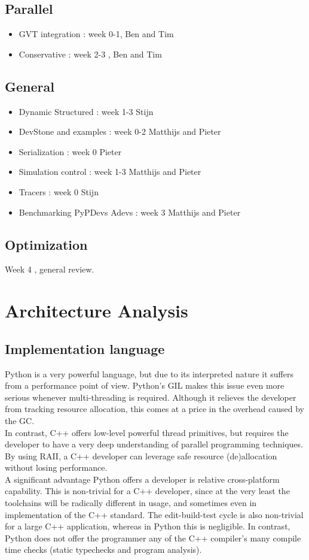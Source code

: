 \documentclass[8pt,a4paper]{report}
\begin{document}
\section{Parallel}
\begin {itemize}
\item GVT integration : week 0-1, Ben and Tim
\item Conservative : week 2-3 , Ben and Tim
\end {itemize}
\section{General}
\begin {itemize}
\item Dynamic Structured : week 1-3 Stijn
\item DevStone and examples : week 0-2 Matthijs and Pieter
\item Serialization : week 0 Pieter
\item Simulation control : week 1-3 Matthijs and Pieter  
\item Tracers : week 0 Stijn
\item Benchmarking PyPDevs Adevs : week 3 Matthijs and Pieter
\end {itemize}
\section{Optimization}
Week 4 , general review.

\chapter{Architecture Analysis}
\section{Implementation language}
Python is a very powerful language, but due to its interpreted nature it suffers from a performance point of view. Python's GIL \cite{gil} makes this issue even more serious whenever multi-threading is required. Although it relieves the developer from tracking resource allocation, this comes at a price in the overhead caused by the GC. \\
In contrast, C++ offers low-level powerful thread primitives, but requires the developer to have a very deep understanding of parallel programming techniques. By using RAII, a C++ developer can leverage safe resource (de)allocation without losing performance.\\
A significant advantage Python offers a developer is relative cross-platform capability. This is non-trivial for a C++ developer, since at the very least the toolchains will be radically different in usage, and sometimes even in implementation of the C++ standard. The edit-build-test cycle is also non-trivial for a large C++ application, whereas in Python this is negligible. In contrast, Python does not offer the programmer any of the C++ compiler's many compile time checks (static typechecks and program analysis).
\end{document}
